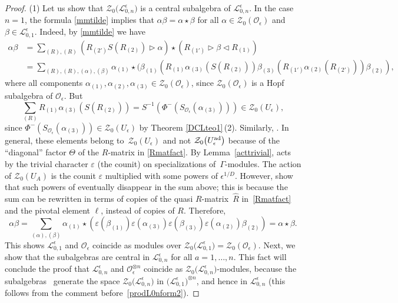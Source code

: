 \documentclass[pdftex]{sigma}
\numberwithin{equation}{section}
\theoremstyle{definition}
\newcommand{\e}{\epsilon}
\newcommand{\Ll}{{\mathcal L}}
\newcommand{\Oo}{{\mathcal O}}
\begin{document}
\begin{proof} (1) Let us show that $\mathcal{Z}_0\bigl(\Ll_{0,n}^\e\bigr)$ is a central subalgebra of $\Ll_{0,n}^\e$. In the case $n=1$, the formula \eqref{mmtilde} implies that $\alpha \beta = \alpha\star \beta$ for all $\alpha\in \mathcal{Z}_0(\Oo_\e)$ and $\beta\in \Ll_{0,1}^\e$. Indeed, by \eqref{mmtilde} we have %
\begin{align*}
\alpha\beta & = \sum_{(R),(R)}(R_{(2')}{S}(R_{(2)}) \rhd \alpha) \star (R_{(1')}\rhd \beta \lhd R_{(1)})\\
& = \sum_{(R),(R),(\alpha), (\beta)} \alpha_{(1)} \star ( \beta_{(1)}(R_{(1)}\alpha_{(3)}(S(R_{(2)}))\beta_{(3)}(R_{(1')}\alpha_{(2)}(R_{(2')}))\beta_{(2)}),
\end{align*}
where all components $\alpha_{(1)}, \alpha_{(2)}, \alpha_{(3)}\in \mathcal{Z}_0(\Oo_\e)$, since $\mathcal{Z}_0(\Oo_\e)$ is a Hopf subalgebra of $\Oo_\e$. But
\[
 \sum_{(R)} R_{(1)}\alpha_{(3)}(S(R_{(2)})) = S^{-1}(\Phi^{-}(S_{\Oo_\e}(\alpha_{(3)})))\in \mathcal{Z}_0(U_\epsilon),
\]
 since $\Phi^-(S_{\Oo_\e}(\alpha_{(3)})) \in \mathcal{Z}_0(U_\epsilon)$ by Theorem \ref{DCLteo1}\,(2). Similarly, . In general, these elements belong to~$\mathcal{Z}_0(U_\epsilon)$ and not ${\mathcal Z}_0\big(U_\epsilon^{\rm ad}\big)$ because of the ``diagonal'' factor $\Theta$ of the $R$-matrix in \eqref{Rmatfact}. By Lemma~\ref{acttrivial},  acts by the trivial character $\varepsilon$ (the counit) on specializations of~$\Gamma$-modules. The action of ${\mathcal Z}_0(U_A)$ is the counit $\varepsilon$ multiplied with some powers of $\epsilon^{1/D}$.
However, \cite[Propositions 4.1 and 4.10]{BR} show that such powers of  eventually disappear in the sum above; this is because the sum can be rewritten in terms of copies of the quasi $R$-matrix~$\hat{R}$ in~\eqref{Rmatfact} and the pivotal element $\ell$, instead of copies of $R$. Therefore, \begin{equation}\label{produitZ0eps}
\alpha\beta = \sum_{(\alpha), (\beta)} \alpha_{(1)} \star ( \varepsilon(\beta_{(1)})\varepsilon(\alpha_{(3)})\varepsilon(\beta_{(3)})\varepsilon(\alpha_{(2)})\beta_{(2)}) = \alpha \star \beta.
\end{equation}
This shows $\Ll_{0,1}^\e$ and $\Oo_\e$ coincide as modules over
$\mathcal{Z}_0\bigl(\Ll_{0,1}^\e\bigr)= \mathcal{Z}_0(\Oo_\e)$.
 Next, we show that the subalgebras \smash{$\mathcal{Z}_0(\Oo_\e)^{(a)}$} are central in $\Ll_{0,n}^\e$ for all $a=1,\dots,n$. This fact will conclude the proof that $\Ll_{0,n}^\e$ and $\Oo_\e^{\otimes n}$ coincide as $\mathcal{Z}_0\bigl(\Ll_{0,n}^\e\bigr)$-modules, because the subalgebras~\smash{$\mathcal{Z}_0(\Oo_\e)^{(a)}$} generate the space $\mathcal{Z}_0\bigl(\Ll_{0,n}^\e\bigr)$ in $\bigl(\Ll_{0,1}^\e\bigr)^{\otimes n}$, and hence in $\Ll_{0,n}^\e$ (this follows from the comment before~\eqref{prodL0nform2}).


\end{proof}
\end{document}

